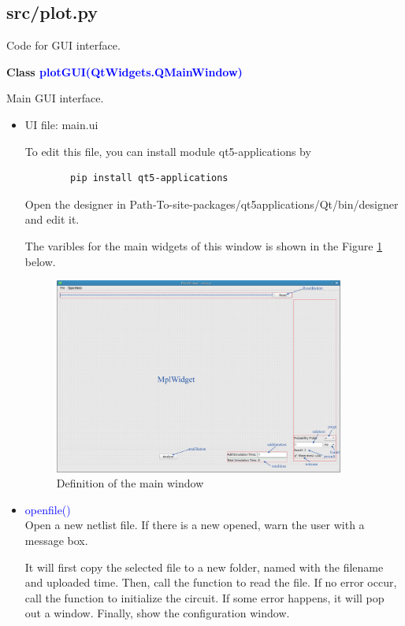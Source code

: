 \documentclass[12pt,a4paper]{article}
\begin{document}
\begin{itemize}[leftmargin=*]
\subsection{src/plot.py}
Code for GUI interface.

\textbf{Class \textcolor{blue}{plotGUI(QtWidgets.QMainWindow)}}

Main GUI interface.

\begin{itemize}
    \item UI file: main.ui\par
        To edit this file, you can install module qt5-applications by
        \begin{lstlisting}
        pip install qt5-applications
        \end{lstlisting}

        Open the designer in Path-To-site-packages/qt5\textunderscore applications/Qt/bin/designer and edit it.

        The varibles for the main widgets of this window is shown in the Figure \ref{Main} below.
        \begin{figure}[ht]
            \centering
            \includegraphics[width=0.9\textwidth]{Image/main.eps}
            \caption{Definition of the main window}
            \label{Main}
        \end{figure}


    \item \textcolor{blue}{openfile()}\\
        Open a new netlist file. If there is a new opened, warn the user with a message box.\label{}

        It will first copy the selected file to a new folder, named with the filename and uploaded time. Then, call the function to read the file. If no error occur, call the function to initialize the circuit. If some error happens, it will pop out a window. Finally, show the configuration window.


\end{itemize}
\end{itemize}
\end{document}
